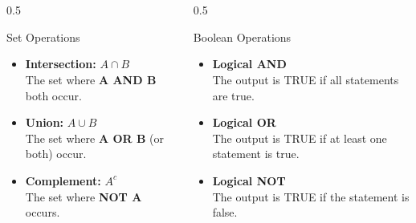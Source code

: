 \begin{frame}[t]
\frametitle{\ }
\begin{columns}[T]
    \begin{column}{0.5\textwidth}
        \begin{block}{Set Operations}
            \begin{itemize}
                \item \textbf{Intersection:} $A \cap B$ \\ The set where \textbf{A AND B} both occur.
                \item \textbf{Union:} $A \cup B$ \\ The set where \textbf{A OR B} (or both) occur.
                \item \textbf{Complement:} $A^c$ \\ The set where \textbf{NOT A} occurs.
            \end{itemize}
        \end{block}
    \end{column}
    
    \begin{column}{0.5\textwidth}
        \begin{block}{Boolean Operations}
            \begin{itemize}
                \item \textbf{Logical AND} \\ The output is TRUE if all statements are true.
                \item \textbf{Logical OR} \\ The output is TRUE if at least one statement is true.
                \item \textbf{Logical NOT} \\ The output is TRUE if the statement is false.
            \end{itemize}
        \end{block}
    \end{column}
\end{columns}
\end{frame}

